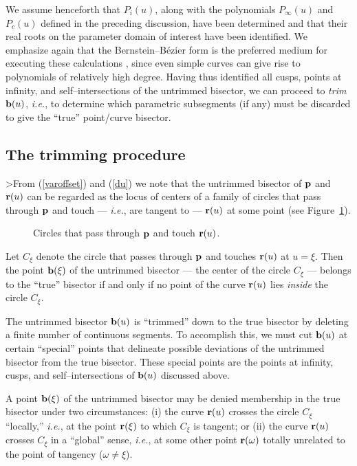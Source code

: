 We assume henceforth that $P_i(u)$, along with the polynomials
$P_\infty(u)$ and $P_c(u)$ defined in the preceding discussion,
have been determined and that their real roots on the parameter
domain of interest have been identified. We emphasize again that
the Bernstein--B\'ezier form is the preferred medium for executing
these calculations \cite{farouki91a}, since even simple curves can
give rise to polynomials of relatively high degree. Having thus
identified all cusps, points at infinity, and self--intersections
of the untrimmed bisector, we can proceed to {\it trim\/} ${\bf b}
(u)$, {\it i.e.}, to determine which parametric subsegments (if
any) must be discarded to give the ``true'' point/curve bisector.

\subsection{The trimming procedure}

>From (\ref{varoffset}) and (\ref{du}) we note that the untrimmed
bisector of ${\bf p}$ and ${\bf r}(u)$ can be regarded as the locus
of centers of a family of circles that pass through ${\bf p}$ and
touch --- {\it i.e.}, are tangent to --- ${\bf r}(u)$ at some point
(see Figure~\ref{fig:circles}).

\begin{figure}[htbp] \vspace{3.9in}
\caption[]{Circles that pass through ${\bf p}$ and touch ${\bf r}(u)$.}
\label{fig:circles} \end{figure}

\begin{rmk} \label{rmk:bis} {\rm
Let $C_\xi$ denote the circle that passes through ${\bf p}$ and
touches ${\bf r}(u)$ at $u=\xi$. Then the point ${\bf b}(\xi)$ of
the untrimmed bisector --- the center of the circle $C_\xi$ ---
belongs to the ``true'' bisector if and only if no point of the
curve ${\bf r}(u)$ lies {\it inside\/} the circle $C_\xi$. }
\end{rmk}

The untrimmed bisector ${\bf b}(u)$ is ``trimmed'' down to the
true bisector by deleting a finite number of continuous segments.
To accomplish this, we must cut ${\bf b}(u)$ at certain ``special''
points that delineate possible deviations of the untrimmed bisector
from the true bisector. These special points are the points at
infinity, cusps, and self--intersections of ${\bf b}(u)$ discussed
above.

A point ${\bf b}(\xi)$ of the untrimmed bisector may be denied
membership in the true bisector under two circumstances: (i) the
curve ${\bf r}(u)$ crosses the circle $C_\xi$ ``locally,'' {\it
i.e.}, at the point ${\bf r}(\xi)$ to which $C_\xi$ is tangent;
or (ii) the curve ${\bf r}(u)$ crosses $C_\xi$ in a ``global''
sense, {\it i.e.}, at some other point ${\bf r}(\omega)$ totally
unrelated to the point of tangency ($\omega\not=\xi$).

